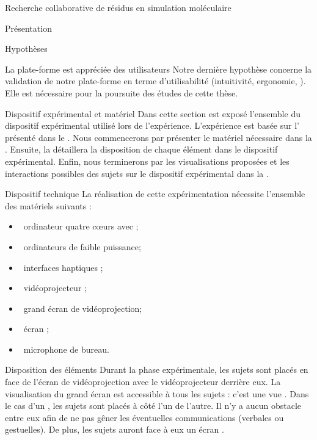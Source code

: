 \documentclass[myfrancais]{mythesis}
\begin{document}
\begin{mychapter}{Recherche collaborative de résidus en simulation moléculaire}
\begin{mysection}{Présentation}
\begin{mysubsection}{Hypothèses}
\begin{myparagraph}{ La plate-forme est appréciée des utilisateurs}
					Notre dernière hypothèse concerne la validation de notre plate-forme en terme d'utilisabilité (intuitivité, ergonomie, \myetc).
					Elle est nécessaire pour la poursuite des études de cette thèse.
				\end{myparagraph}
			\end{mysubsection}
		\end{mysection}
		\begin{mysection}{Dispositif expérimental et matériel}
			Dans cette section est exposé l'ensemble du dispositif expérimental utilisé lors de l'expérience.
			L'expérience est basée sur l' présenté dans le .
			Nous commencerons par présenter le matériel nécessaire dans la .
			Ensuite, la  détaillera la disposition de chaque élément dans le dispositif expérimental.
			Enfin, nous terminerons par les visualisations proposées et les interactions possibles des sujets sur le dispositif expérimental dans la .
			\begin{mysubsection}{Dispositif technique}
				La réalisation de cette expérimentation nécessite l'ensemble des matériels suivants :
				\begin{itemize}
					\item {}~ordinateur quatre cœurs \myIntelCore avec ;
					\item {}~ordinateurs de faible puissance;
					\item {}~interfaces haptiques \myOmni;
					\item {}~vidéoprojecteur \myCasioXJ;
					\item {}~grand écran de vidéoprojection;
					\item {}~écran \myLCD {};
					\item {}~microphone de bureau.
				\end{itemize}
			\end{mysubsection}
			\begin{mysubsection}{Disposition des éléments}
				Durant la phase expérimentale, les sujets sont placés en face de l'écran de vidéoprojection avec le vidéoprojecteur derrière eux.
				La visualisation du grand écran est accessible à tous les sujets : c'est une vue .
				Dans le cas d'un , les sujets sont placés à côté l'un de l'autre.
				Il n'y a aucun obstacle entre eux afin de ne pas gêner les éventuelles communications (verbales ou gestuelles).
				De plus, les sujets auront face à eux un écran \myLCD.


\end{mysubsection}
\end{mysection}
\end{mychapter}
\end{document}
